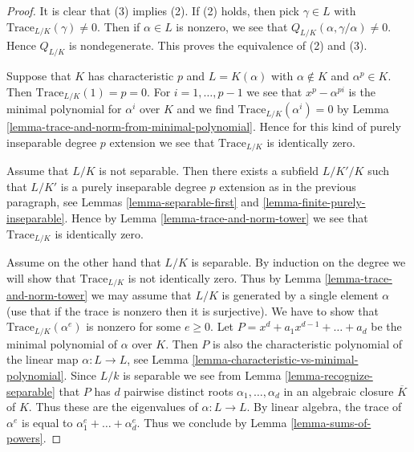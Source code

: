 \begin{proof}
It is clear that (3) implies (2). If (2) holds, then pick $\gamma \in L$
with $\text{Trace}_{L/K}(\gamma) \not = 0$. Then if $\alpha \in L$
is nonzero, we see that $Q_{L/K}(\alpha, \gamma/\alpha) \not = 0$.
Hence $Q_{L/K}$ is nondegenerate. This proves the equivalence of
(2) and (3).

\medskip\noindent
Suppose that $K$ has characteristic $p$ and $L = K(\alpha)$ with
$\alpha \not \in K$ and $\alpha^p \in K$. Then $\text{Trace}_{L/K}(1) = p = 0$.
For $i = 1, \ldots, p - 1$ we see that $x^p - \alpha^{pi}$ is the minimal
polynomial for $\alpha^i$ over $K$ and we find
$\text{Trace}_{L/K}(\alpha^i) = 0$ by
Lemma \ref{lemma-trace-and-norm-from-minimal-polynomial}.
Hence for this kind of purely inseparable degree $p$ extension
we see that $\text{Trace}_{L/K}$ is identically zero.

\medskip\noindent
Assume that $L/K$ is not separable. Then there exists a subfield
$L/K'/K$ such that $L/K'$ is a purely inseparable degree $p$ extension
as in the previous paragraph, see
Lemmas \ref{lemma-separable-first} and \ref{lemma-finite-purely-inseparable}.
Hence by Lemma \ref{lemma-trace-and-norm-tower}
we see that $\text{Trace}_{L/K}$ is identically zero.

\medskip\noindent
Assume on the other hand that $L/K$ is separable.
By induction on the degree we will show that
$\text{Trace}_{L/K}$ is not identically zero.
Thus by Lemma \ref{lemma-trace-and-norm-tower} we may assume that
$L/K$ is generated by a single element $\alpha$ (use that if
the trace is nonzero then it is surjective).
We have to show that $\text{Trace}_{L/K}(\alpha^e)$
is nonzero for some $e \geq 0$.
Let $P = x^d + a_1 x^{d - 1} + \ldots + a_d$ be the minimal
polynomial of $\alpha$ over $K$.
Then $P$ is also the characteristic polynomial of the linear
map $\alpha : L \to L$, see
Lemma \ref{lemma-characteristic-vs-minimal-polynomial}.
Since $L/k$ is separable we see from Lemma \ref{lemma-recognize-separable}
that $P$ has $d$ pairwise distinct roots $\alpha_1, \ldots, \alpha_d$
in an algebraic closure $\overline{K}$ of $K$. Thus these are the
eigenvalues of $\alpha : L \to L$.
By linear algebra, the trace of $\alpha^e$ is
equal to $\alpha_1^e + \ldots + \alpha_d^e$.
Thus we conclude by Lemma \ref{lemma-sums-of-powers}.
\end{proof}

